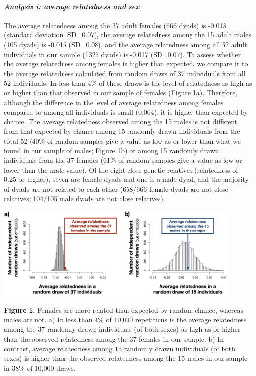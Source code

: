 \documentclass[
]{article}
\begin{document}
\hypertarget{analysis-i-average-relatedness-and-sex-1}{%
\paragraph{\texorpdfstring{\emph{Analysis i: average relatedness and
sex}}{Analysis i: average relatedness and sex}}\label{analysis-i-average-relatedness-and-sex-1}}

The average relatedness among the 37 adult females (666 dyads) is -0.013
(standard deviation, SD=0.07), the average relatedness among the 15
adult males (105 dyads) is -0.015 (SD=0.08), and the average relatedness
among all 52 adult individuals in our sample (1326 dyads) is -0.017
(SD=0.07). To assess whether the average relatedness among females is
higher than expected, we compare it to the average relatedness
calculated from random draws of 37 individuals from all 52 individuals.
In less than 4\% of these draws is the level of relatedness as high as
or higher than that observed in our sample of females (Figure 1a).
Therefore, although the difference in the level of average relatedness
among females compared to among all individuals is small (0.004), it is
higher than expected by chance. The average relatedness observed among
the 15 males is not different from that expected by chance among 15
randomly drawn individuals from the total 52 (40\% of random samples
give a value as low as or lower than what we found in our sample of
males; Figure 1b) or among 15 randomly drawn individuals from the 37
females (61\% of random samples give a value as low or lower than the
male value). Of the eight close genetic relatives (relatedness of 0.25
or higher), seven are female dyads and one is a male dyad, and the
majority of dyads are not related to each other (658/666 female dyads
are not close relatives; 104/105 male dyads are not close relatives).

\includegraphics[width=0.9\textwidth,height=\textheight]{gdispersal_Figure1.png}

\textbf{Figure 2.} Females are more related than expected by random
chance, whereas males are not. a) In less than 4\% of 10,000 repetitions
is the average relatedness among the 37 randomly drawn individuals (of
both sexes) as high as or higher than the observed relatedness among the
37 females in our sample. b) In contrast, average relatedness among 15
randomly drawn individuals (of both sexes) is higher than the observed
relatedness among the 15 males in our sample in 38\% of 10,000 draws.
\end{document}
